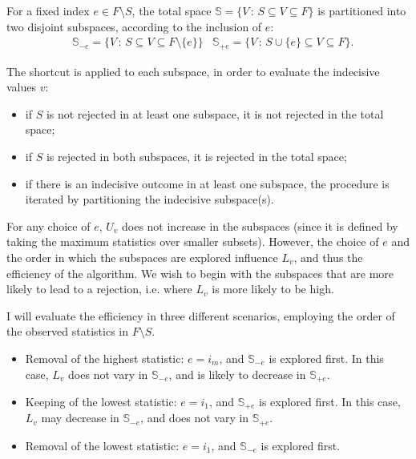 \documentclass[11pt,a4paper,openright,twoside]{article}
\begin{document}
For a fixed index $e\in F\setminus S$, the total space $\mathbb{S}=\{V\,:\,S\subseteq V\subseteq F\}$ is partitioned into two disjoint subspaces, according to the inclusion of $e$:
\begin{align*}
&\mathbb{S}_{-e}=\{V\,:\,S\subseteq V\subseteq F\setminus\{e\}\} & \mathbb{S}_{+e}=\{V\,:\,S\cup\{e\}\subseteq V\subseteq F\}.
\end{align*}

The shortcut is applied to each subspace, in order to evaluate the indecisive values $v$:
\begin{itemize}
\item if $S$ is not rejected in at least one subspace, it is not rejected in the total space;
\item if $S$ is rejected in both subspaces, it is rejected in the total space;
\item if there is an indecisive outcome in at least one subspace, the procedure is iterated by partitioning the indecisive subspace(s).
\end{itemize}

For any choice of $e$, $U_v$ does not increase in the subspaces (since it is defined by taking the maximum statistics over smaller subsets). However, the choice of $e$ and the order in which the subspaces are explored influence $L_v$, and thus the efficiency of the algorithm. We wish to begin with the subspaces that are more likely to lead to a rejection, i.e. where $L_v$ is more likely to be high.

I will evaluate the efficiency in three different scenarios, employing the order of the observed statistics in $F\setminus S$.
\begin{itemize}
\item Removal of the highest statistic: $e=i_m$, and $\mathbb{S}_{-e}$ is explored first. In this case, $L_v$ does not vary in $\mathbb{S}_{-e}$, and is likely to decrease in $\mathbb{S}_{+e}$.
\item Keeping of the lowest statistic: $e=i_1$, and $\mathbb{S}_{+e}$ is explored first. In this case, $L_v$ may decrease in $\mathbb{S}_{-e}$, and does not vary in $\mathbb{S}_{+e}$.
\item Removal of the lowest statistic: $e=i_1$, and $\mathbb{S}_{-e}$ is explored first.
\end{itemize}
\end{document}
